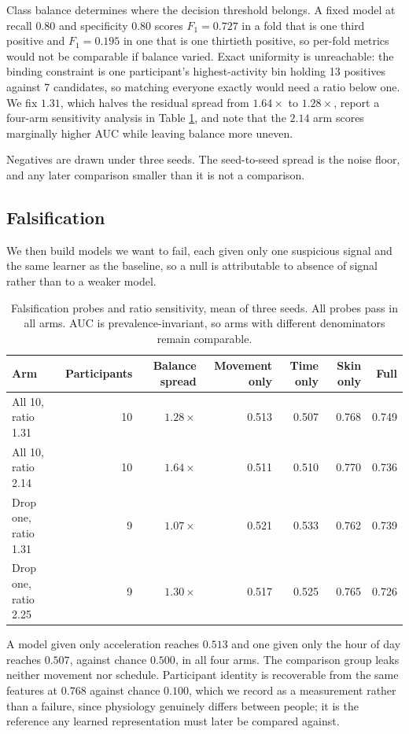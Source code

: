 Class balance determines where the decision threshold belongs. A fixed model at
recall $0.80$ and specificity $0.80$ scores $F_1 = 0.727$ in a fold that is one
third positive and $F_1 = 0.195$ in one that is one thirtieth positive, so
per-fold metrics would not be comparable if balance varied. Exact uniformity is
unreachable: the binding constraint is one participant's highest-activity bin
holding 13 positives against 7 candidates, so matching everyone exactly would
need a ratio below one. We fix $1.31$, which halves the residual spread from
$1.64\times$ to $1.28\times$, report a four-arm sensitivity analysis in Table
\ref{tab:sens}, and note that the $2.14$ arm scores marginally higher AUC while
leaving balance more uneven.

Negatives are drawn under three seeds. The seed-to-seed spread is the noise
floor, and any later comparison smaller than it is not a comparison.

\subsection{Falsification}

We then build models we want to fail, each given only one suspicious signal and
the same learner as the baseline, so a null is attributable to absence of
signal rather than to a weaker model.

\begin{table}[t]
\caption{Falsification probes and ratio sensitivity, mean of three seeds. All
probes pass in all arms. AUC is prevalence-invariant, so arms with different
denominators remain comparable.}
\label{tab:sens}
\centering
\begin{tabular}{lrrrrrr}
\toprule
Arm & Participants & Balance spread & Movement only & Time only & Skin only & Full \\
\midrule
All 10, ratio 1.31   & 10 & $1.28\times$ & 0.513 & 0.507 & 0.768 & 0.749 \\
All 10, ratio 2.14   & 10 & $1.64\times$ & 0.511 & 0.510 & 0.770 & 0.736 \\
Drop one, ratio 1.31 &  9 & $1.07\times$ & 0.521 & 0.533 & 0.762 & 0.739 \\
Drop one, ratio 2.25 &  9 & $1.30\times$ & 0.517 & 0.525 & 0.765 & 0.726 \\
\bottomrule
\end{tabular}
\end{table}

A model given only acceleration reaches $0.513$ and one given only the hour of
day reaches $0.507$, against chance $0.500$, in all four arms. The comparison
group leaks neither movement nor schedule. Participant identity is recoverable
from the same features at $0.768$ against chance $0.100$, which we record as a
measurement rather than a failure, since physiology genuinely differs between
people; it is the reference any learned representation must later be compared
against.


